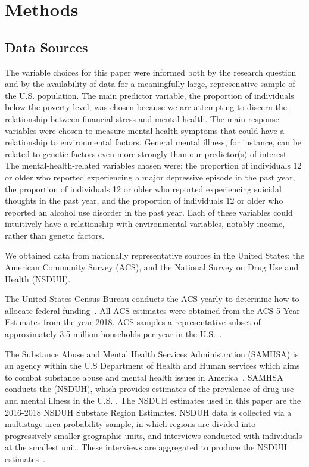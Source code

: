 \documentclass{article}
\begin{document}
\section{Methods}

\subsection{Data Sources}

The variable choices for this paper were informed both
by the research question and
by the availability of data for a
meaningfully large, represenative sample of the U.S. population.
The main predictor variable, the
proportion of individuals below the poverty level, was chosen
because we are attempting to discern the relationship between financial
stress and mental health.
The main response variables were chosen to measure mental health
symptoms that could have a relationship to environmental factors.
General mental illness, for instance, can be related to genetic factors
even more strongly than our predictor(s) of interest. The
mental-health-related variables chosen were: the proportion of individuals 12
or older who reported experiencing a major depressive episode in the
past year, the proportion of individuals 12 or older who reported
experiencing suicidal thoughts in the past year, and the proportion of
individuals 12 or older who reported an alcohol use disorder in the past
year. Each of these variables could intuitively have a relationship with
environmental variables, notably income, rather than genetic factors.

We obtained data from nationally representative sources
in the United States:
the American Community Survey (ACS), and
the National Survey on Drug Use and Health (NSDUH).

The United States Census Bureau
conducts the ACS yearly
to determine how to allocate federal
funding~\cite{acs_description}.
All ACS estimates were obtained from
the ACS 5-Year Estimates from the year 2018.
ACS samples a representative subset of
approximately 3.5 million households per year
in the U.S.~\cite{acs_sampling}.


The Substance Abuse and Mental Health Services Administration
(SAMHSA)
is an agency within
the U.S Department of Health and Human services which
aims to combat substance abuse and mental health
issues in America~\cite{samhsa_about_us}.
SAMHSA conducts
the (NSDUH),
which provides
estimates of the prevalence of drug use and mental illness
in the U.S.
\cite{samhsa_data}.
The NSDUH estimates used in this paper are the
2016-2018 NSDUH Substate Region Estimates.
NSDUH data is collected via a multistage area probability sample,
in which regions are divided
into progressively smaller geographic units,
and interviews conducted with individuals at the smallest unit.
These interviews are aggregated to produce the NSDUH
estimates~\cite{nsduh_description}.
\end{document}
